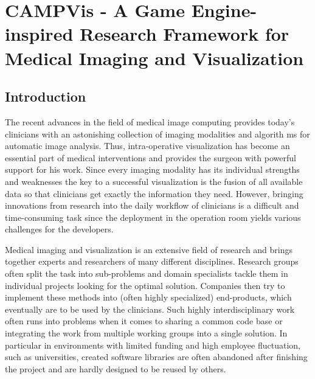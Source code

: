 %

\chapter{CAMPVis - A Game Engine-inspired Research Framework for Medical Imaging and Visualization}

\section{Introduction}
The recent advances in the field of medical image computing provides today's clinicians with an astonishing collection of imaging modalities and algorith ms for automatic image analysis.
Thus, intra-operative visualization has become an essential part of medical interventions and provides the surgeon with powerful support for his work. 
Since every imaging modality has its individual strengths and weaknesses the key to a successful visualization is the fusion of all available data so that clinicians get exactly the information they need.
However, bringing innovations from research into the daily workflow of clinicians is a difficult and time-consuming task since the deployment in the operation room yields various challenges for the developers.

Medical imaging and visualization is an extensive field of research and brings together experts and researchers of many different disciplines.
Research groups often split the task into sub-problems and domain specialists tackle them in individual projects looking for the optimal solution.
Companies then try to implement these methods into (often highly specialized) end-products, which eventually are to be used by the clinicians.
Such highly interdisciplinary work often runs into problems when it comes to sharing a common code base or integrating the work from multiple working groups into a single solution.
In particular in environments with limited funding and high employee fluctuation, such as universities, created software libraries are often abandoned after finishing the project and are hardly designed to be reused by others.


